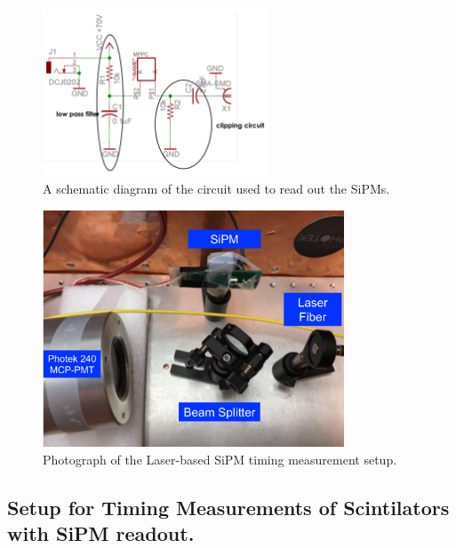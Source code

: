 \begin{figure}[htbp]
\centering
\includegraphics[width=0.60\textwidth]{figures/CircuitDiagram.pdf}
\caption{A schematic diagram of the circuit used to read out the SiPMs.}
\label{fig:Circuit}
\end{figure}



\begin{figure}[htbp] 
\centering
\includegraphics[width=0.80\textwidth]{figures/SiPMSetup1.pdf} 
\caption{Photograph of the Laser-based SiPM timing measurement setup.} 
\label{fig:laserSetup} 
\end{figure} 

\subsection{Setup for Timing Measurements of Scintilators with SiPM readout.}

